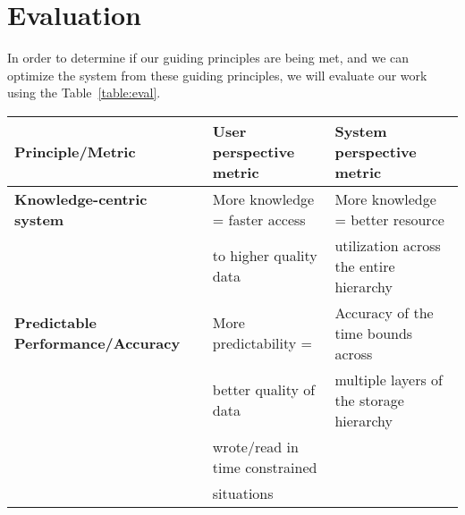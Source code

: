 \section{Evaluation}
\label{sec:evaluation}
In order to determine if our guiding principles are being met, and we can optimize the system from these guiding principles, 
we will evaluate our work using the Table~\ref{table:eval}.
 

\begin{tabular}{ | l | l | l | }

\hline
	{\bf Principle/Metric}                   & {\bf User perspective metric}                     & {\bf System perspective metric }\\ \hline
	{\bf Knowledge-centric system} & More knowledge = faster access            &  More knowledge = better resource\\
                                                               &    to higher quality data                               &    utilization across the entire hierarchy \\ \hline
                                                                                                                                        
                                                                                                                                         
                                                                                                                                             
        {\bf Predictable Performance/Accuracy} & More predictability =                     &  Accuracy of the time bounds across \\
                                                                             & better quality of data                      &  multiple layers of the storage hierarchy \\ 
                                                                             & wrote/read in time constrained\\
                                                                             & situations \\ \hline
                                                                                                                                         
                                                                                                                                            
\end{tabular}

